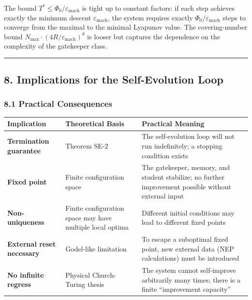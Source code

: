 \documentclass[
  12pt,
]{article}
\begin{document}
The bound \(T^* \leq \Phi_0/\varepsilon_{\text{mach}}\) is tight up to
constant factors: if each step achieves exactly the minimum descent
\(\varepsilon_{\text{mach}}\), the system requires exactly
\(\Phi_0/\varepsilon_{\text{mach}}\) steps to converge from the maximal
to the minimal Lyapunov value. The covering-number bound
\(N_{\text{max}} \cdot (4R/\varepsilon_{\text{mach}})^d\) is looser but
captures the dependence on the complexity of the gatekeeper class.

\begin{center}\rule{0.5\linewidth}{0.5pt}\end{center}

\subsection{8. Implications for the Self-Evolution
Loop}\label{implications-for-the-self-evolution-loop}

\subsubsection{8.1 Practical Consequences}\label{practical-consequences}

\begin{longtable}[]{@{}
  >{\raggedright\arraybackslash}p{}
  >{\raggedright\arraybackslash}p{}
  >{\raggedright\arraybackslash}p{}@{}}
\toprule\noalign{}
\begin{minipage}[b]{\linewidth}\raggedright
Implication
\end{minipage} & \begin{minipage}[b]{\linewidth}\raggedright
Theoretical Basis
\end{minipage} & \begin{minipage}[b]{\linewidth}\raggedright
Practical Meaning
\end{minipage} \\
\midrule\noalign{}
\endhead
\bottomrule\noalign{}
\endlastfoot
\textbf{Termination guarantee} & Theorem SE-2 & The self-evolution loop
will not run indefinitely; a stopping condition exists \\
\textbf{Fixed point} & Finite configuration space & The gatekeeper,
memory, and student stabilize; no further improvement possible without
external input \\
\textbf{Non-uniqueness} & Finite configuration space may have multiple
local optima & Different initial conditions may lead to different fixed
points \\
\textbf{External reset necessary} & Godel-like limitation & To escape a
suboptimal fixed point, new external data (NEP calculations) must be
introduced \\
\textbf{No infinite regress} & Physical Church-Turing thesis & The
system cannot self-improve arbitrarily many times; there is a finite
``improvement capacity'' \\
\end{longtable}
\end{document}
